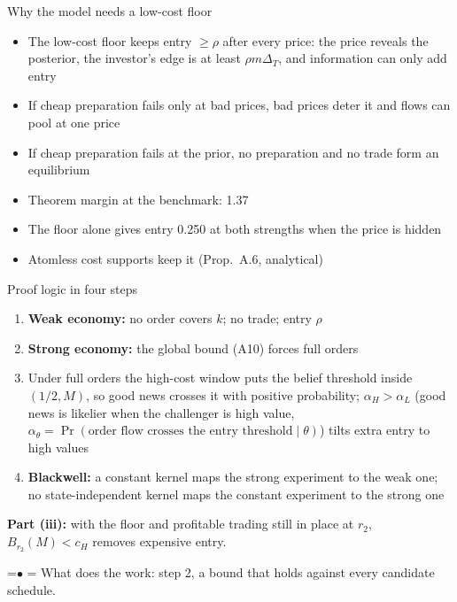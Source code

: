 \documentclass[10pt,aspectratio=169]{beamer}
\newcommand{\Status}[1]{{\color{cGrayText}\scriptsize #1}}
\newcommand{\Cost}[1]{\textcolor{cCost}{#1}}
\newcommand{\TakeawayBody}[1]{\begin{minipage}{\textwidth}\raggedright\normalsize
    \setbox0=\hbox{{\usebeamercolor[fg]{structure}\raise0.7pt\hbox{\scriptsize$\bullet$}}\hspace{0.55em}}%
    \hangindent=\wd0 \hangafter=1 \noindent\box0 #1\par
  \end{minipage}}
\renewcommand{\Takeaway}[2][\ExhibitReadingGap]{\par\vspace{#1}\noindent\TakeawayBody{#2}\par}
\newcommand{\NavGap}{\par\vspace{0.45cm}}%
\let\AdapterBackButton\BackButton
\renewcommand{\BackButton}[1]{\NavGap\AdapterBackButton{#1}}%
\begin{document}
\begin{frame}[label=A15]{Why the model needs a low-cost floor}
\hypertarget{app:floor}{}
\begin{itemize}\setlength{\itemsep}{6pt}
\item The \Cost{low-cost floor} keeps entry $\ge\rho$ after every price: the price reveals the posterior, the investor's edge is at least $\rho m\Delta_T$, and information can only add entry
\item If cheap preparation fails only at bad prices, bad prices deter it and flows can pool at one price
\item If cheap preparation fails at the prior, no preparation and no trade form an equilibrium
\item Theorem margin at the benchmark: 1.37 %
\item The floor alone gives entry 0.250 %
at both strengths when the price is hidden
\item Atomless cost supports keep it \Status{(Prop.~A.6, analytical)}
\end{itemize}
\end{frame}

\begin{frame}[label=A16]{Proof logic in four steps}
\hypertarget{app:proof}{}
\begin{enumerate}\setlength{\itemsep}{5pt}
\item \textbf{Weak economy:} no order covers $k$; no trade; entry $\rho$
\item \textbf{Strong economy:} the global bound (A10) forces full orders
\item Under full orders the high-cost window puts the belief threshold inside $(1/2,M)$, so good news crosses it with positive probability; $\alpha_H>\alpha_L$ (good news is likelier when the challenger is high value, $\alpha_\theta=\Pr(\text{order flow crosses the entry threshold}\mid\theta)$) tilts extra entry to high values
\item \textbf{Blackwell:} a constant kernel maps the strong experiment to the weak one; no state-independent kernel maps the constant experiment to the strong one
\end{enumerate}
\medskip
\textbf{Part (iii):} with the floor and profitable trading still in place at $r_2$, $B_{r_2}(M)<c_H$ removes expensive entry.
\Takeaway{What does the work: step 2, a bound that holds against every candidate schedule.}
\end{frame}
\end{document}
